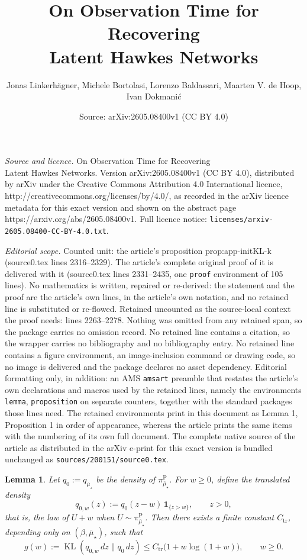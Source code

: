 \documentclass[10pt,a4paper]{amsart}
\title{On Observation Time for Recovering \\ Latent Hawkes Networks}
\author{Jonas Linkerh\"agner, Michele Bortolasi, Lorenzo Baldassari, Maarten V. de Hoop, Ivan Dokmani\'c}
\date{Source: arXiv:2605.08400v1 (CC BY 4.0)}
\newtheorem{lemma}{Lemma}
\newcommand{\KL}{\operatorname{KL}}
\begin{document}
\maketitle

\noindent\emph{Source and licence.} On Observation Time for Recovering \\ Latent Hawkes Networks. Version arXiv:2605.08400v1 (CC BY 4.0), distributed by arXiv under the Creative Commons Attribution 4.0 International licence, http://creativecommons.org/licenses/by/4.0/, as recorded in the arXiv licence metadata for this exact version and shown on the abstract page https://arxiv.org/abs/2605.08400v1. Full licence notice: \texttt{licenses/arxiv-2605.08400-CC-BY-4.0.txt}.\par\smallskip

\noindent\textit{Editorial scope.} Counted unit: the article's proposition prop:app-initKL-k (source0.tex lines 2316--2329). The article's complete original proof of it is delivered with it (source0.tex lines 2331--2435, one \texttt{proof} environment of 105 lines). No mathematics is written, repaired or re-derived: the statement and the proof are the article's own lines, in the article's own notation, and no retained line is substituted or re-flowed.  Retained uncounted as the source-local context the proof needs: lines 2263--2278.  Nothing was omitted from any retained span, so the package carries no omission record.  No retained line contains a citation, so the wrapper carries no bibliography and no bibliography entry.  No retained line contains a figure environment, an image-inclusion command or drawing code, so no image is delivered and the package declares no asset dependency.  Editorial formatting only, in addition: an AMS \texttt{amsart} preamble that restates the article's own declarations and macros used by the retained lines, namely the environments \texttt{lemma}, \texttt{proposition} on separate counters, together with the standard packages those lines need.  The retained environments print in this document as Lemma 1, Proposition 1 in order of appearance, whereas the article prints the same items with the numbering of its own full document.  The complete native source of the article as distributed in the arXiv e-print for this exact version is bundled unchanged as \texttt{sources/200151/source0.tex}.
\begin{lemma}\label{lem:app-translation-kl}
Let $q_0:=q_{\bar\mu_\star}$ be the density of $\pi_{\bar\mu_\star}^{\mathrm P}$.
For $w\ge 0$, define the translated density
\[
q_{0,w}(z):=q_0(z-w)\,\mathbf 1_{\{z>w\}},
\qquad z>0,
\]
that is, the law of $U+w$ when $U\sim \pi_{\bar\mu_\star}^{\mathrm P}$.
Then there exists a finite constant $C_{\mathrm{tr}}$, depending only on
$(\beta,\bar\mu_\star)$, such that
\[
g(w):=\KL(q_{0,w}\,dz\|q_0\,dz)
\le C_{\mathrm{tr}}\bigl(1+w\log(1+w)\bigr),
\qquad w\ge 0.
\]
\end{lemma}
\end{document}
